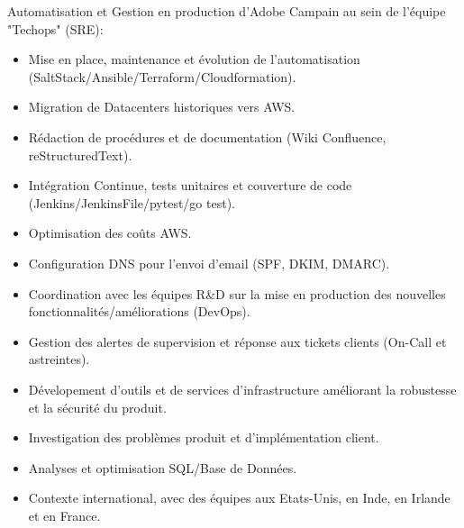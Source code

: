 \documentclass[10pt,a4paper,sans]{moderncv}        %
\begin{document}
        {}
        {}
        {}
        {Automatisation et Gestion en production d'Adobe Campain au sein de l'équipe "Techops" (SRE):
            \begin{itemize}
            \item Mise en place, maintenance et évolution de l'automatisation (SaltStack/Ansible/Terraform/Cloudformation).
            \item Migration de Datacenters historiques vers AWS.
            \item Rédaction de procédures et de documentation (Wiki Confluence, reStructuredText).
            \item Intégration Continue, tests unitaires et couverture de code (Jenkins/JenkinsFile/pytest/go test).
            \item Optimisation des coûts AWS.
            \item Configuration DNS pour l'envoi d'email (SPF, DKIM, DMARC).
            \item Coordination avec les équipes R\&D sur la mise en production des nouvelles fonctionnalités/améliorations (DevOps).
            \item Gestion des alertes de supervision et réponse aux tickets clients (On-Call et astreintes).
            \item Dévelopement d'outils et de services d'infrastructure améliorant la robustesse et la sécurité du produit.
            \item Investigation des problèmes produit et d'implémentation client.
            \item Analyses et optimisation SQL/Base de Données.
            \item Contexte international, avec des équipes aux Etats-Unis, en Inde, en Irlande et en France.
            \end{itemize}
        }
\end{document}

